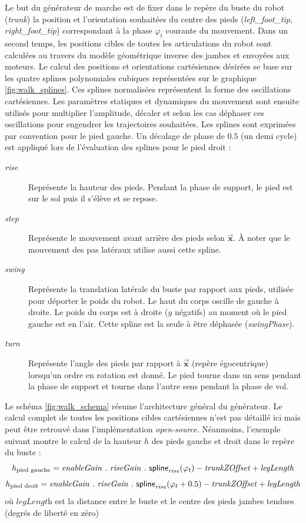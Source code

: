 Le but du générateur de marche est de fixer dans
le repère du buste du robot (\textit{trunk}) la position
et l'orientation souhaitées du centre des pieds 
(\textit{left\_foot\_tip}, \textit{right\_foot\_tip}) correspondant 
à la phase $\varphi_{t}$ courante du mouvement.
Dans un second temps, les positions cibles de toutes les
articulations du robot sont calculées au travers du modèle 
géométrique inverse des jambes et envoyées aux moteurs.
Le calcul des positions et orientations cartésiennes désirées
se base sur les quatre splines polynomiales cubiques représentées 
sur le graphique \ref{fig:walk_splines}.
Ces splines normalisées représentent la forme des oscillations cartésiennes. 
Les paramètres statiques et dynamiques du mouvement sont ensuite utilisés pour 
multiplier l'amplitude, décaler et selon les cas déphaser ces oscillations
pour engendrer les trajectoires souhaitées.
Les splines sont exprimées par convention pour le pied
gauche. Un décalage de phase de $0.5$ (un demi cycle) est appliqué 
lors de l'évaluation des splines pour le pied droit :
\begin{description}
    \item[\textit{rise}] Représente la hauteur des pieds. 
        Pendant la phase de support, le pied est sur le sol 
        puis il s'élève et se repose.
    \item[\textit{step}] Représente le mouvement avant arrière des pieds selon $\bm{\vec{x}}$.
        À noter que le mouvement des pas latéraux utilise aussi cette spline.
    \item[\textit{swing}] Représente la translation latérale du buste par 
        rapport aux pieds, utilisée pour déporter le poids du robot.
        Le haut du corps oscille de gauche à droite. 
        Le poids du corps est à droite ($y$ négatifs) au moment où le pied gauche est en l'air.
        Cette spline est la seule à être déphasée (\textit{swingPhase}).
    \item[\textit{turn}] Représente l'angle des pieds par rapport à 
        $\bm{\vec{x}}$ (repère égocentrique) lorsqu'un ordre en rotation est donné.
        Le pied tourne dans un sens pendant la phase de support 
        et tourne dans l'autre sens pendant la phase de vol.
\end{description}

Le schéma \ref{fig:walk_schema} résume l'architecture général du générateur.
Le calcul complet de toutes les positions cibles cartésiennes n'est pas 
détaillé ici mais peut être retrouvé dans 
l'implémentation \textit{open-source}.
Néanmoins, l'exemple suivant montre le calcul de la hauteur $h$ des
pieds gauche et droit dans le repère du buste :
$$
h_{\text{pied gauche}} = 
\text{\textit{enableGain}}~.~\text{\textit{riseGain}}~.~\mathsf{spline}_{\text{\textit{rise}}}(\varphi_{t})
- \text{\textit{trunkZOffset}}
+ \text{\textit{legLength}}
$$
$$
h_{\text{pied droit}} = 
\text{\textit{enableGain}}~.~\text{\textit{riseGain}}~.~\mathsf{spline}_{\text{\textit{rise}}}(\varphi_{t}+0.5)
- \text{\textit{trunkZOffset}}
+ \text{\textit{legLength}}
$$
où $\textit{legLength}$ est la distance entre le buste et le centre 
des pieds jambes tendues (degrés de liberté en zéro)

